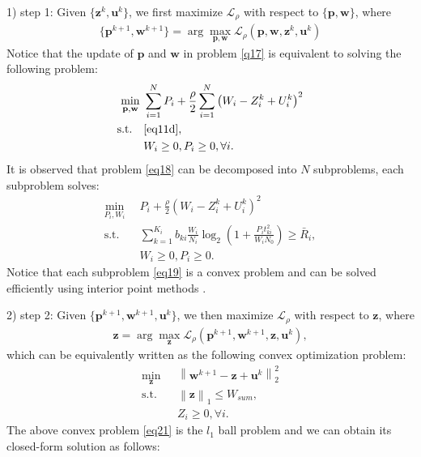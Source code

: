 \documentclass[journal]{IEEEtran}
\begin{document}
1) step 1: Given $\{\mathbf{z}^k, \mathbf{u}^k\}$, we first maximize $\mathcal{L}_\rho$ with respect to $\{\mathbf{p}, \mathbf{w}\}$, where
\begin{align}
\{\mathbf{p}^{k+1}, \mathbf{w}^{k+1}\} = \arg \max_{\mathbf{p}, \mathbf{w}} \mathcal{L}_\rho\left(\mathbf{p}, \mathbf{w}, \mathbf{z}^k, \mathbf{u}^k\right) \label{q17}
\end{align}
Notice that the update of $\mathbf{p}$ and $\mathbf{w}$ in problem \eqref{q17} is equivalent to solving the following problem:
\begin{subequations}\label{eq18}
	\begin{align}
	\min_{\mathbf{p}, \mathbf{w}}\ & \sum\limits_{i = 1}^{N} P_i + \frac{\rho}{2}\sum\limits_{i = 1}^{N}\left(W_i - Z_i^k + U_i^k \right)^2  \label{eq18a} \\ \mbox{s.t.} \quad &  \eqref{eq11d},  \label{eq18b} \\
	& W_i\geq 0, P_i \geq 0, \forall i. \label{eq18c}
	\end{align}
\end{subequations}
It is observed that problem \eqref{eq18} can be decomposed into $N$ subproblems, each subproblem solves:
\begin{subequations}\label{eq19}
	\begin{align}
	\min_{P_i, W_i}\ & P_i + \frac{\rho}{2}\left(W_i - Z_i^k + U_i^k \right)^2  \label{eq19a} \\ \mbox{s.t.} \quad & \sum\limits_{k = 1}^{K_i}b_{ki}\frac{W_i}{N_i}\log_2\left(1 + \frac{P_it_{ki}^2}{W_iN_0}\right) \geq \bar{R}_i,  \label{eq19b} \\
	& W_i\geq 0, P_i \geq 0. \label{eq19c}
	\end{align}
\end{subequations}
Notice that each subproblem \eqref{eq19} is a convex problem and can be solved efficiently using interior point methods \cite{SBoyd3}.

2) step 2: Given $\{\mathbf{p}^{k+1}, \mathbf{w}^{k+1}, \mathbf{u}^k\}$, we then maximize $\mathcal{L}_\rho$ with respect to $\mathbf{z}$, where
\begin{align}
\mathbf{z} = \arg \max_{\mathbf{z}} \mathcal{L}_\rho\left(\mathbf{p}^{k+1}, \mathbf{w}^{k+1}, \mathbf{z}, \mathbf{u}^k\right),
\end{align} 
which can be equivalently written as the following convex optimization problem: 
\begin{subequations}\label{eq21}
	\begin{align}
	\min_{\mathbf{z}}\ & \left\|\mathbf{w}^{k+1} - \mathbf{z} + \mathbf{u}^k \right\|_2^2 \label{eq21a} \\ \mbox{s.t.} \quad & \left\|\mathbf{z} \right\|_1 \leq W_{sum},  \label{eq21b} \\
	& Z_i\geq 0, \forall i. \label{eq21c}
	\end{align}
\end{subequations}
The above convex problem \eqref{eq21} is the $l_1$ ball problem \cite{JDuchi} and we can obtain its closed-form solution as follows:
\end{document}
